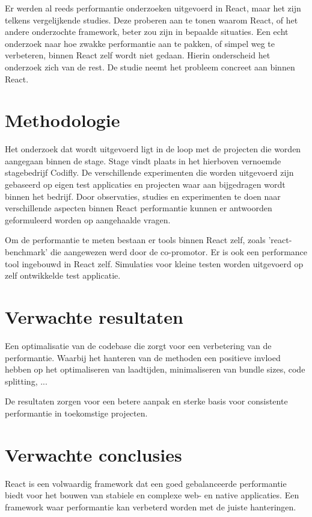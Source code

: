 Er werden al reeds performantie onderzoeken uitgevoerd in React, maar het zijn telkens vergelijkende studies. Deze proberen aan te tonen waarom React, of het andere onderzochte framework, beter zou zijn in bepaalde situaties. Een echt onderzoek naar hoe zwakke performantie aan te pakken, of simpel weg te verbeteren, binnen React zelf wordt niet gedaan. Hierin onderscheid het onderzoek zich van de rest. De studie neemt het probleem concreet aan binnen React.


\section{Methodologie}
\label{sec:methodologie}

Het onderzoek dat wordt uitgevoerd ligt in de loop met de projecten die worden aangegaan binnen de stage. Stage vindt plaats in het hierboven vernoemde stagebedrijf Codifly. De verschillende experimenten die worden uitgevoerd zijn gebaseerd op eigen test applicaties en projecten waar aan bijgedragen wordt binnen het bedrijf. Door observaties, studies en experimenten te doen naar verschillende aspecten binnen React performantie kunnen er antwoorden geformuleerd worden op aangehaalde vragen.

Om de performantie te meten bestaan er tools binnen React zelf, zoals 'react-benchmark' die aangewezen werd door de co-promotor. Er is ook een performance tool ingebouwd in React zelf. Simulaties voor kleine testen worden uitgevoerd op zelf ontwikkelde test applicatie. 

\section{Verwachte resultaten}
\label{sec:verwachte_resultaten}

Een optimalisatie van de codebase die zorgt voor een verbetering van de performantie. Waarbij het hanteren van de methoden een positieve invloed hebben op het optimaliseren van laadtijden, minimaliseren van bundle sizes, code splitting, ...

De resultaten zorgen voor een betere aanpak en sterke basis voor consistente performantie in toekomstige projecten.

\section{Verwachte conclusies}
\label{sec:verwachte_conclusies}

React is een volwaardig framework dat een goed gebalanceerde performantie biedt voor het bouwen van stabiele en complexe web- en native applicaties. Een framework waar performantie kan verbeterd worden met de juiste hanteringen.


